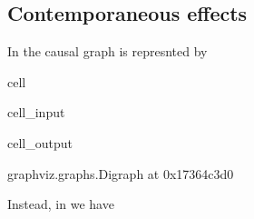 \documentclass[letterpaper,10pt,english]{jupyterBook}
\begin{document}
\subsection{Contemporaneous effects}
\label{\detokenize{notebooks/structural_breaks_example:contemporaneous-effects}}
\sphinxAtStartPar
In  the causal graph is represnted by

\begin{sphinxuseclass}{cell}\begin{sphinxVerbatimInput}

\begin{sphinxuseclass}{cell_input}
\begin{sphinxVerbatim}[commandchars=\\\{\}]
   

  \PYG{p}{[}\PYG{p}{[}  \PYG{p}{]}
              \PYG{p}{[}  \PYG{p}{]}
              \PYG{p}{[} \PYG{p}{]}\PYG{p}{]}

\end{sphinxVerbatim}

\end{sphinxuseclass}\end{sphinxVerbatimInput}
\begin{sphinxVerbatimOutput}

\begin{sphinxuseclass}{cell_output}
\begin{sphinxVerbatim}[commandchars=\\\{\}]
\PYGZlt{}graphviz.graphs.Digraph at 0x17364c3d0\PYGZgt{}
\end{sphinxVerbatim}

\end{sphinxuseclass}\end{sphinxVerbatimOutput}

\end{sphinxuseclass}
\sphinxAtStartPar
Instead, in  we have
\end{document}
